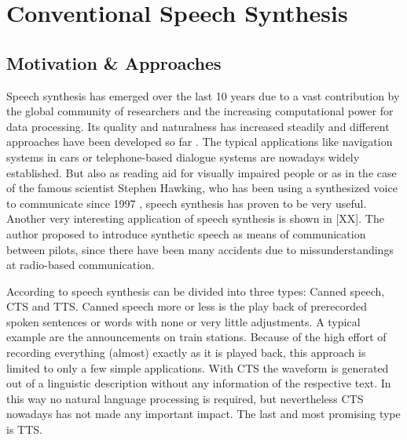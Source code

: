 

\section{Conventional Speech Synthesis}
\label{sec:speech}

\subsection{Motivation \& Approaches}
\label{subsec:convenspeech}

Speech synthesis has emerged over the last 10 years due to a vast contribution by the global community of researchers and the increasing computational power for data processing. Its quality and naturalness has increased steadily and different approaches have been developed so far \cite{suendermann:challenges}. The typical applications like navigation systems in cars or telephone-based dialogue systems are nowadays widely established. But also as reading aid for visually impaired people \cite{readspeaker:tts} or as in the case of the famous scientist Stephen Hawking, who has been using a synthesized voice to communicate since 1997 \cite{hawking:speech}, speech synthesis has proven to be very useful. Another very interesting application of speech synthesis is shown in [XX]. The author proposed to introduce synthetic speech as means of communication between pilots, since there have been many accidents due to missunderstandings at radio-based communication. %

According to \cite{hinterleitner:quality} speech synthesis can be divided into three types: Canned speech, \ac{CTS} and \ac{TTS}. Canned speech more or less is the play back of prerecorded spoken sentences or words with none or very little adjustments. A typical example are the announcements on train stations. Because of the high effort of recording everything (almost) exactly as it is played back, this approach is limited to only a few simple applications. With \ac{CTS} the waveform is generated out of a linguistic description without any information of the respective text. In this way no natural language processing is required, but nevertheless \ac{CTS} nowadays has not made any important impact. The last and most promising type is \ac{TTS}.


